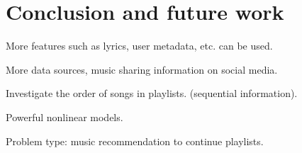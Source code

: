 \section{Conclusion and future work}

More features such as lyrics, user metadata, etc. can be used.

More data sources, music sharing information on social media.

Investigate the order of songs in playlists. (sequential information).

Powerful nonlinear models.

Problem type: music recommendation to continue playlists.
